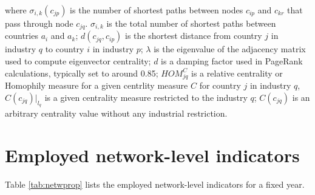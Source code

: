 \documentclass[preprint, 3p,
authoryear]{elsarticle} %
\begin{document}
\noindent where \(\sigma_{i,k}(c_{jp})\) is the number of shortest paths
between nodes \(c_{ip}\) and \(c_{kr}\) that pass through node
\(c_{jq}\). \(\sigma_{i,k}\) is the total number of shortest paths
between countries \(a_i\) and \(a_k\); \(d(c_{jq},c_{ip})\) is the
shortest distance from country \(j\) in industry \(q\) to country \(i\)
in industry \(p\); \(\lambda\) is the eigenvalue of the adjacency matrix
used to compute eigenvector centrality; \(d\) is a damping factor used
in PageRank calculations, typically set to around 0.85; \(HOM_{jq}^C\)
is a relative centrality or Homophily measure for a given centrlity
measure \(C\) for country \(j\) in industry \(q\), \(C(c_{jq})|_{l_q}\)
is a given centrality measure restricted to the industry \(q\);
\(C(c_{jq})\) is an arbitrary centrality value without any industrial
restriction.

\section{Employed network-level
indicators}\label{employed-network-level-indicators}

Table \ref{tab:netwprop} lists the employed network-level indicators for
a fixed year.
\end{document}
